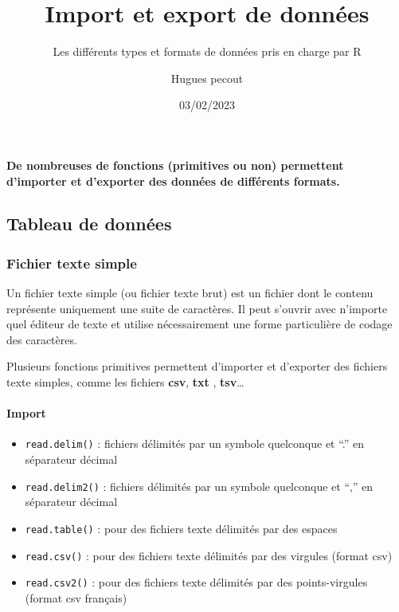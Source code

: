 \documentclass[
  letterpaper,
  DIV=11,
  numbers=noendperiod]{scrartcl}
\title{Import et export de données}
\subtitle{Les différents types et formats de données pris en charge par
R}
\author{Hugues pecout}
\date{03/02/2023}
\let\oldparagraph\paragraph
\renewcommand{\paragraph}[1]{\oldparagraph{#1}\mbox{}}
\providecommand{\tightlist}{%
  \setlength{\itemsep}{0pt}\setlength{\parskip}{0pt}}\usepackage{longtable,booktabs,array}
\renewcommand*\contentsname{Table des matières}
\newcommand\contentsname{Table des matières}
\begin{document}
\maketitle
\ifdefined\Shaded\renewenvironment{Shaded}{\begin{tcolorbox}[breakable, enhanced, boxrule=0pt, borderline west={3pt}{0pt}{shadecolor}, interior hidden, sharp corners, frame hidden]}{\end{tcolorbox}}\fi

\renewcommand*\contentsname{Table des matières}
{
\hypersetup{linkcolor=}
\setcounter{tocdepth}{3}
\tableofcontents
}
\textbf{De nombreuses de fonctions (primitives ou non) permettent
d'importer et d'exporter des données de différents formats.}

\hypertarget{tableau-de-donnuxe9es}{%
\subsection{\texorpdfstring{\textbf{Tableau de
données}}{Tableau de données}}\label{tableau-de-donnuxe9es}}

\hypertarget{fichier-texte-simple}{%
\subsubsection{Fichier texte simple}\label{fichier-texte-simple}}

Un fichier texte simple (ou fichier texte brut) est un fichier dont le
contenu représente uniquement une suite de caractères. Il peut s'ouvrir
avec n'importe quel éditeur de texte et utilise nécessairement une forme
particulière de codage des caractères.

Plusieurs fonctions primitives permettent d'importer et d'exporter des
fichiers texte simples, comme les fichiers \textbf{csv}, \textbf{txt} ,
\textbf{tsv}\ldots{}

\hypertarget{import}{%
\paragraph{Import}\label{import}}

\begin{itemize}
\tightlist
\item
  \texttt{read.delim()} : fichiers délimités par un symbole quelconque
  et ``.'' en séparateur décimal
\item
  \texttt{read.delim2()} : fichiers délimités par un symbole quelconque
  et ``,'' en séparateur décimal
\item
  \texttt{read.table()} : pour des fichiers texte délimités par des
  espaces\\
\item
  \texttt{read.csv()} : pour des fichiers texte délimités par des
  virgules (format csv)
\item
  \texttt{read.csv2()} : pour des fichiers texte délimités par des
  points-virgules (format csv français)
\end{itemize}
\end{document}
